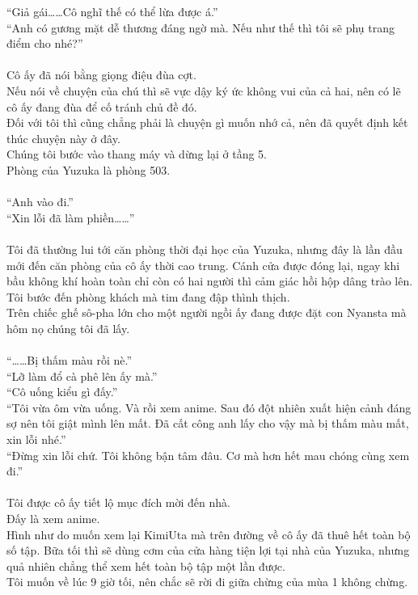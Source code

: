 \documentclass[12pt,a4paper, twosides]{book}
\begin{document}
“Giả gái……Cô nghĩ thế có thể lừa được á.”\\
“Anh có gương mặt dễ thương đáng ngờ mà. Nếu như thế thì tôi sẽ phụ trang điểm cho nhé?”\\
\\
Cô ấy đã nói bằng giọng điệu đùa cợt.\\
Nếu nói về chuyện của chú thì sẽ vực dậy ký ức không vui của cả hai, nên có lẽ cô ấy đang đùa để cố tránh chủ đề đó.\\
Đối với tôi thì cũng chẳng phải là chuyện gì muốn nhớ cả, nên đã quyết định kết thúc chuyện này ở đây.\\
Chúng tôi bước vào thang máy và dừng lại ở tầng 5.\\
Phòng của Yuzuka là phòng 503.\\
\\
“Anh vào đi.”\\
“Xin lỗi đã làm phiền……”\\
\\
Tôi đã thường lui tới căn phòng thời đại học của Yuzuka, nhưng đây là lần đầu mới đến căn phòng của cô ấy thời cao trung. Cánh cửa được đóng lại, ngay khi bầu không khí hoàn toàn chỉ còn có hai người thì cảm giác hồi hộp dâng trào lên.\\
Tôi bước đến phòng khách mà tim đang đập thình thịch.\\
Trên chiếc ghế sô-pha lớn cho một người ngồi ấy đang được đặt con Nyansta mà hôm nọ chúng tôi đã lấy.\\
\\
“……Bị thấm màu rồi nè.”\\
“Lỡ làm đổ cà phê lên ấy mà.”\\
“Cô uống kiểu gì đấy.”\\
“Tôi vừa ôm vừa uống. Và rồi xem anime. Sau đó đột nhiên xuất hiện cảnh đáng sợ nên tôi giật mình lên mất. Đã cất công anh lấy cho vậy mà bị thấm màu mất, xin lỗi nhé.”\\
“Đừng xin lỗi chứ. Tôi không bận tâm đâu. Cơ mà hơn hết mau chóng cùng xem đi.”\\
\\
Tôi được cô ấy tiết lộ mục đích mời đến nhà.\\
Đấy là xem anime.\\
Hình như do muốn xem lại KimiUta mà trên đường về cô ấy đã thuê hết toàn bộ số tập. Bữa tối thì sẽ dùng cơm của cửa hàng tiện lợi tại nhà của Yuzuka, nhưng quả nhiên chẳng thể xem hết toàn bộ tập một lần được.\\
Tôi muốn về lúc 9 giờ tối, nên chắc sẽ rời đi giữa chừng của mùa 1 không chừng.\\
\end{document}

